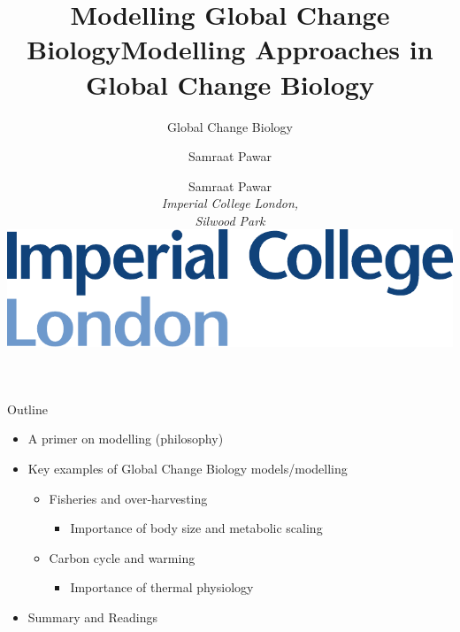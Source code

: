 \documentclass[xcolor={usenames,x11names},compress]{beamer}
\title{Modelling Global Change Biology}
\author{Samraat Pawar}
\renewcommand{\(}{\begin{columns}}
\renewcommand{\)}{\end{columns}}
\newcommand{\<}[1]{\begin{column}{#1}}
\renewcommand{\>}{\end{column}}
\begin{document}
\begin{frame}[plain]

\title{Modelling Approaches in Global Change Biology}
\vspace{12pt}
\subtitle{Global Change Biology}
\author{
	Samraat Pawar\\
	\vspace{10pt}
	{\it Imperial College London,\\
	\vspace{5pt}
	Silwood Park}\\
	\vspace{20pt}
  \centering
  \includegraphics[height = .3in]{Imperial_Color1.pdf}
}
 
\titlepage
\end{frame}


\begin{frame}{Outline}
  \begin{itemize}\setlength{\itemindent}{0em}\itemsep12pt

    \item A primer on modelling (philosophy) 

    \item Key examples of Global Change Biology models/modelling
    \begin{itemize}
        \item Fisheries and over-harvesting 
        \begin{itemize}
          \item Importance of body size and metabolic scaling
        \end{itemize}        
        \item  Carbon cycle and warming
        \begin{itemize}
          \item Importance of thermal physiology
        \end{itemize}        
      \end{itemize}
    
      \item Summary and Readings
    \end{itemize}  

\end{frame}
\end{document}
